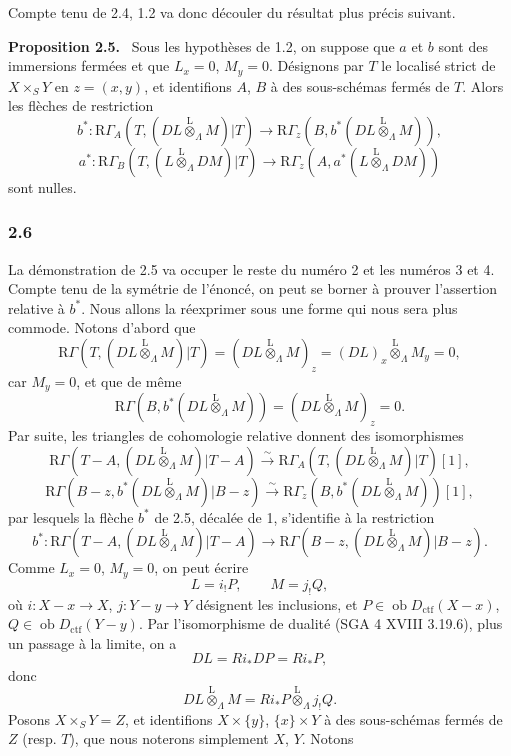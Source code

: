 \documentclass[11pt]{article}
\newenvironment{statement}[1]{\par\medskip\noindent\textbf{#1.}\ }{\par\medskip}
\providecommand{\lten}{\overset{\mathrm L}{\otimes}}
\providecommand{\Ob}{\operatorname{ob}}
\providecommand{\lten}{\overset{\mathrm L}{\otimes}}
\providecommand{\lten}{\overset{\mathrm L}{\otimes}}
\providecommand{\Ob}{\operatorname{ob}}
\providecommand{\lten}{\overset{\mathrm L}{\otimes}}
\providecommand{\lten}{\overset{\mathrm L}{\otimes}}
\providecommand{\Ob}{\operatorname{Ob}}
\providecommand{\lten}{\overset{\mathrm L}{\otimes}}
\begin{document}
Compte tenu de 2.4, 1.2 va donc découler du résultat plus précis suivant.

\begin{statement}{Proposition 2.5}
Sous les hypothèses de 1.2, on suppose que $a$ et $b$ sont des immersions fermées et que $L_x=0$, $M_y=0$. Désignons par $T$ le localisé strict de $X\times_SY$ en $z=(x,y)$, et identifions $A$, $B$ à des sous-schémas fermés de $T$. Alors les flèches de restriction
\[
b^*:\mathrm R\Gamma_A(T,(DL\lten_{\Lambda}M)|T)
 \longrightarrow \mathrm R\Gamma_z(B,b^*(DL\lten_{\Lambda}M)),
\]
\[
a^*:\mathrm R\Gamma_B(T,(L\lten_{\Lambda}DM)|T)
 \longrightarrow \mathrm R\Gamma_z(A,a^*(L\lten_{\Lambda}DM))
\]
sont nulles.
\end{statement}

\subsubsection*{2.6}
La démonstration de 2.5 va occuper le reste du numéro 2 et les numéros 3 et 4. Compte tenu de la symétrie de l'énoncé, on peut se borner à prouver l'assertion relative à $b^*$. Nous allons la réexprimer sous une forme qui nous sera plus commode. Notons d'abord que
\[
\mathrm R\Gamma(T,(DL\lten_{\Lambda}M)|T)
 =(DL\lten_{\Lambda}M)_z
 =(DL)_x\lten_{\Lambda}M_y=0,
\]
car $M_y=0$, et que de même
\[
\mathrm R\Gamma(B,b^*(DL\lten_{\Lambda}M))
 =(DL\lten_{\Lambda}M)_z=0.
\]
Par suite, les triangles de cohomologie relative donnent des isomorphismes
\[
\mathrm R\Gamma(T-A,(DL\lten_{\Lambda}M)|T-A)
 \xrightarrow{\sim}
\mathrm R\Gamma_A(T,(DL\lten_{\Lambda}M)|T)[1],
\]
\[
\mathrm R\Gamma(B-z,b^*(DL\lten_{\Lambda}M)|B-z)
 \xrightarrow{\sim}
\mathrm R\Gamma_z(B,b^*(DL\lten_{\Lambda}M))[1],
\]
par lesquels la flèche $b^*$ de 2.5, décalée de 1, s'identifie à la restriction
\begin{equation}
b^*:\mathrm R\Gamma(T-A,(DL\lten_{\Lambda}M)|T-A)
 \longrightarrow \mathrm R\Gamma(B-z,(DL\lten_{\Lambda}M)|B-z).
\tag{2.6.1}
\end{equation}
Comme $L_x=0$, $M_y=0$, on peut écrire
\begin{equation}
L=i_!P,\qquad M=j_!Q,
\tag{2.6.2}
\end{equation}
où $i:X-x\to X$, $j:Y-y\to Y$ désignent les inclusions, et $P\in\Ob D_{\mathrm{ctf}}(X-x)$, $Q\in\Ob D_{\mathrm{ctf}}(Y-y)$. Par l'isomorphisme de dualité (SGA 4 XVIII 3.19.6), plus un passage à la limite, on a
\[
DL=Ri_*DP=Ri_*P,
\]
donc
\[
DL\lten_{\Lambda}M=Ri_*P\lten_{\Lambda}j_!Q.
\]
Posons $X\times_SY=Z$, et identifions $X\times\{y\}$, $\{x\}\times Y$ à des sous-schémas fermés de $Z$ (resp. $T$), que nous noterons simplement $X$, $Y$. Notons
\end{document}

